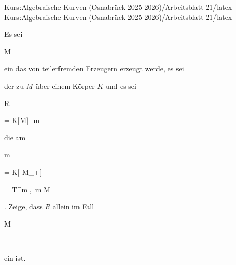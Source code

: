 Kurs:Algebraische Kurven (Osnabrück 2025-2026)/Arbeitsblatt 21/latex
Kurs:Algebraische Kurven (Osnabrück 2025-2026)/Arbeitsblatt 21/latex

\setcounter{section}{21}





{}

{


Es sei


\mavergleichskette

{\vergleichskette

{ M
}

{ \subseteq }{\N
}

{  }{
}

{    }{
}

{   }{
}

}
{}{}{}
ein
das von teilerfremden Erzeugern erzeugt werde, es sei

 der
zu $M$ über einem Körper $K$ und es sei


\mavergleichskettedisp

{\vergleichskette

{ R
}

{ =} { K[M]_{\mathfrak m}
}

{ } {
}

{ } {
}

{ } {
}

}
{}{}{}
die
am


\mavergleichskette

{\vergleichskette

{ {\mathfrak m}
}

{ = }{ K[ M_+]
}

{ = }{ \langle  T^m ,\, m \in M  \rangle
}

{    }{
}

{   }{
}

}
{}{}{.}
Zeige, dass $R$ allein im Fall


\mavergleichskette

{\vergleichskette

{ M
}

{ = }{ \N
}

{  }{
}

{    }{
}

{   }{
}

}
{}{}{}
ein
ist.


}

